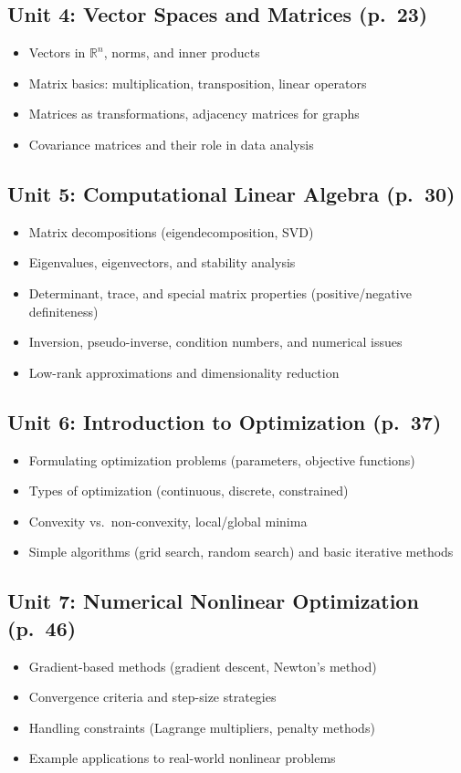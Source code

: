 \documentclass{article}
\begin{document}
\subsection*{Unit 4: Vector Spaces and Matrices (p.~23)}
\begin{itemize}
    \item Vectors in $\mathbb{R}^n$, norms, and inner products 
    \item Matrix basics: multiplication, transposition, linear operators 
    \item Matrices as transformations, adjacency matrices for graphs 
    \item Covariance matrices and their role in data analysis 
\end{itemize}

\subsection*{Unit 5: Computational Linear Algebra (p.~30)}
\begin{itemize}
    \item Matrix decompositions (eigendecomposition, SVD) 
    \item Eigenvalues, eigenvectors, and stability analysis 
    \item Determinant, trace, and special matrix properties (positive/negative definiteness) 
    \item Inversion, pseudo-inverse, condition numbers, and numerical issues 
    \item Low-rank approximations and dimensionality reduction
\end{itemize}

\subsection*{Unit 6: Introduction to Optimization (p.~37)}
\begin{itemize}
    \item Formulating optimization problems (parameters, objective functions) 
    \item Types of optimization (continuous, discrete, constrained) 
    \item Convexity vs.\ non-convexity, local/global minima 
    \item Simple algorithms (grid search, random search) and basic iterative methods
\end{itemize}

\subsection*{Unit 7: Numerical Nonlinear Optimization (p.~46)}
\begin{itemize}
    \item Gradient-based methods (gradient descent, Newton’s method) 
    \item Convergence criteria and step-size strategies 
    \item Handling constraints (Lagrange multipliers, penalty methods) 
    \item Example applications to real-world nonlinear problems
\end{itemize}
\end{document}
